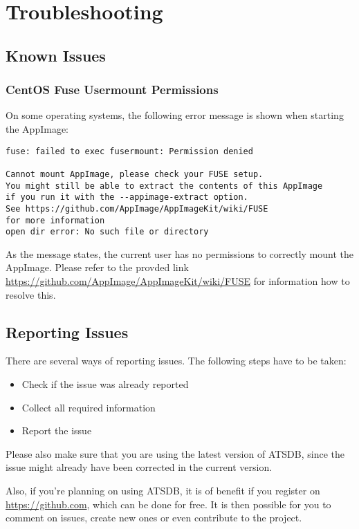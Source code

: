 \chapter{Troubleshooting}
\label{sec:troubleshooting}

\section{Known Issues}

\subsection{CentOS Fuse Usermount Permissions}

On some operating systems, the following error message is shown when starting the AppImage:

\begin{verbatim}
fuse: failed to exec fusermount: Permission denied

Cannot mount AppImage, please check your FUSE setup.
You might still be able to extract the contents of this AppImage 
if you run it with the --appimage-extract option. 
See https://github.com/AppImage/AppImageKit/wiki/FUSE 
for more information
open dir error: No such file or directory
\end{verbatim}


As the message states, the current user has no permissions to correctly mount the AppImage. Please refer to the provded link \url{https://github.com/AppImage/AppImageKit/wiki/FUSE} for information how to resolve this.

\section{Reporting Issues}

There are several ways of reporting issues. The following steps have to be taken:

\begin{itemize}  
\item Check if the issue was already reported
\item Collect all required information
\item Report the issue
\end{itemize} 

Please also make sure that you are using the latest version of ATSDB, since the issue might already have been corrected in the current version.

Also, if you're planning on using ATSDB, it is of benefit if you register on \url{https://github.com}, which can be done for free. It is then possible for you to comment on issues, create new ones or even contribute to the project.


